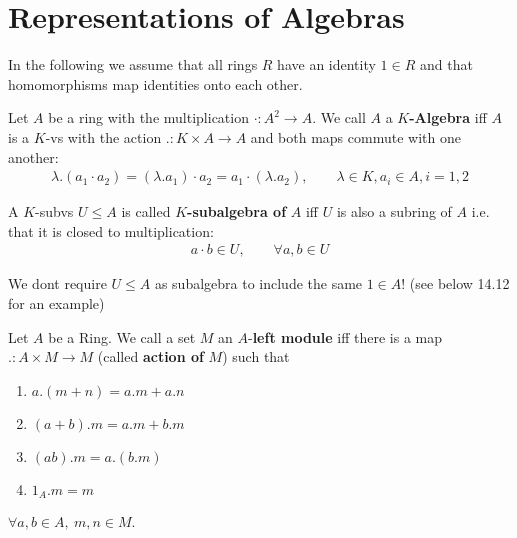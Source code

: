 \documentclass[]{article}
\begin{document}
\setcounter{section}{13}
\section{Representations of Algebras}

In the following we assume that all rings \(R\) have an identity \(1 \in R\) and that homomorphisms map identities onto each other.

\begin{definition}
    Let \(A\) be a ring with the multiplication \(\cdot: A^2 \rightarrow A\). We call \(A\) a \(K\)\textbf{-Algebra} iff \(A\) is a \(K\)-vs 
    with the action \(.:K\times A \rightarrow A\) and both maps commute with one another:
    \begin{align*}
        \lambda . (a_1 \cdot a_2) = (\lambda . a_1)\cdot a_2 = a_1 \cdot (\lambda . a_2), \qquad \lambda \in K, a_i \in A, i=1,2
    \end{align*}
\end{definition}

\begin{definition*}[subalgebra]
    A \(K\)-subvs \(U \leq A\) is called \(K\)\textbf{-subalgebra of} \(A\) iff
    \(U\) is also a subring of \(A\) i.e. that it is closed to multiplication:
    \begin{align*}
         a \cdot b \in U, \qquad \forall a,b \in U
    \end{align*}
\end{definition*}

\begin{note*}
We dont require \(U \leq A\) as subalgebra to include the same \(1 \in A\)! (see below 14.12 for an example)
\end{note*}

\setcounter{theorem}{4}
\begin{definition}
    Let \(A\) be a Ring. We call a set \(M\) an \(A\)-\textbf{left module} 
    iff there is a map \(.: A \times M \rightarrow M\) (called \textbf{action of} \(M\)) such that 
    \begin{enumerate}[label=\roman*)]
    \item \(a.(m+n) = a. m + a.n\)
    \item \((a+b).m=a.m+b.m\)
    \item \((ab).m=a.(b.m)\)
    \item \(1_A . m = m\)
    \end{enumerate}
    \(\forall a,b \in A, \ m,n \in M\).
\end{definition}
\end{document}
